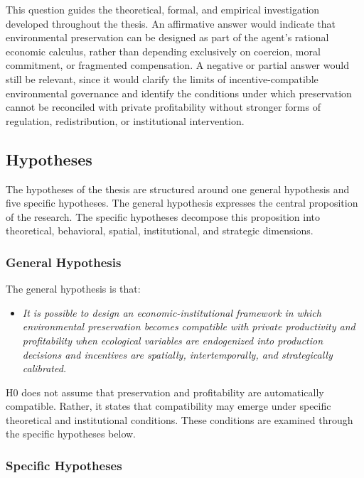This question guides the theoretical, formal, and empirical investigation developed throughout the thesis. An affirmative answer would indicate that environmental preservation can be designed as part of the agent's rational economic calculus, rather than depending exclusively on coercion, moral commitment, or fragmented compensation. A negative or partial answer would still be relevant, since it would clarify the limits of incentive-compatible environmental governance and identify the conditions under which preservation cannot be reconciled with private profitability without stronger forms of regulation, redistribution, or institutional intervention.

\subsection{Hypotheses}

The hypotheses of the thesis are structured around one general hypothesis and five specific hypotheses. The general hypothesis expresses the central proposition of the research. The specific hypotheses decompose this proposition into theoretical, behavioral, spatial, institutional, and strategic dimensions.

\subsubsection{General Hypothesis}

The general hypothesis is that:

\begin{itemize}

    \item[\textbf{H0.}]
    
    \textit{It is possible to design an economic-institutional framework in which environmental preservation becomes compatible with private productivity and profitability when ecological variables are endogenized into production decisions and incentives are spatially, intertemporally, and strategically calibrated.}

\end{itemize}

H0 does not assume that preservation and profitability are automatically compatible. Rather, it states that compatibility may emerge under specific theoretical and institutional conditions. These conditions are examined through the specific hypotheses below.

\subsubsection{Specific Hypotheses}

